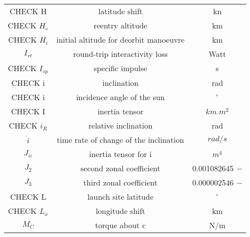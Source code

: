 \documentclass[11pt]{report}
\begin{document}
\begin{center}
\begin{longtable}{c|c|c}
CHECK H                                     & latitude shift                            & kn \\

CHECK $H_e$                                 & reentry altitude     & km \\

CHECK $H_i$                                 & initial altitude for deorbit manoeuvre     & km \\

$I_{rt}$ 														& round-trip interactivity loss 							& Watt \\

CHECK $I_{sp}$													 	& specific impulse 														& s \\

CHECK i 																	& inclination 																& rad \\

CHECK i                                     & incidence angle of the sun                 & $^\circ$ \\

CHECK I                                      & inertia tensor                          & $km.m^2$ \\

CHECK $i_R$ 															& relative inclination 												& rad \\

$\dot i$ 														& time rate of change of the inclination 			& $rad/s$ \\

$J_{ii}$													 	& inertia tensor for i 												& $m^4$ \\

$J_2$														 		& second zonal coefficient 										& 0.001082645 $-$ \\

$J_3$ 															& third zonal coefficient 										& 0.000002546 $-$ \\

CHECK L                                   & launch site latitude                        & $^\circ$ \\

CHECK $L_x$                                & longitude shift                               & km \\

$M_C$ 															& torque about c 															& N/m \\


\end{longtable}
\end{center}
\end{document}
